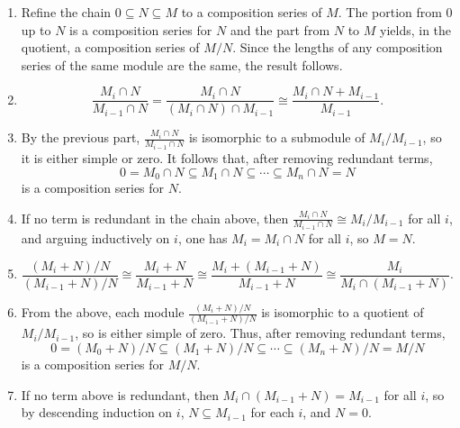 \documentclass[12pt]{amsart}
\renewcommand{\1}{\mathbbm{1}}
\begin{document}
\begin{enumerate}
{\begin{enumerate}
	Now suppose that  $N_{m-1}\neq M_{n-1}$, and set $K\colonequals N_{m-1}\cap M_{n-1}$. By the second isomorphism theorem, we then have
	\[\frac{M}{M_{n-1}} = \frac{M_{n-1}+N_{m-1}}{M_{n-1}} \cong \frac{N_{m-1}}{K}\]
	and similarly $M/N_{m-1} \cong M_{n-1} / K$, and both of these modules are simple. Given a composition series for $K$ of length $t$, one obtains a composition series for $M_{n-1}$ of length $t+1$ and a composition series for $N_{m-1}$ of length $t+1$. Since $\ell(M_{n-1}), \ell(N_{m-1})<\ell(M)$, by induction on length we can assume that $n-1=t+1=m-1$ and we conclude that $m=n$.
	\item Refine the chain $0 \subseteq N \subseteq M$ to a composition series of $M$. The portion from $0$ up to $N$ is a composition series for $N$ and the part from $N$ to $M$ yields, in the quotient, a composition series of $M/N$. Since the lengths of any composition series  of the same module are the same, the result follows.
	\item $$\frac{M_{i} \cap N}{M_{i-1} \cap N} = \frac{M_{i} \cap N}{(M_{i} \cap N) \cap M_{i-1}} \cong \frac{M_{i} \cap N + M_{i-1}} {M_{i-1}}.$$
	\item By the previous part, $\frac{M_{i} \cap N}{M_{i-1} \cap N}$ is isomorphic to a submodule of $M_i / M_{i-1}$, so it is either simple or zero. It follows that, after removing redundant terms,
	\[ 0 = M_0 \cap N \subseteq M_1 \cap N \subseteq \cdots \subseteq M_n \cap N = N\]
	is a composition series for $N$.
	\item If no term is redundant in the chain above, then $\frac{M_{i} \cap N}{M_{i-1} \cap N}\cong M_i/M_{i-1}$ for all $i$, and arguing inductively on $i$, one has $M_i = M_i \cap N$ for all $i$, so $M=N$.
	\item \[ \frac{(M_{i} + N )/ N }{(M_{i-1} + N) / N} \cong \frac{M_{i} + N}{M_{i-1} + N} \cong \frac{M_{i} + (M_{i-1}+N)}{M_{i-1}+N}\cong \frac{M_{i} }{M_{i} \cap( M_{i-1} + N)}.\]
	\item From the above, each module  $\frac{(M_{i} + N )/ N }{(M_{i-1} + N) / N}$ is isomorphic to a quotient of $M_i/M_{i-1}$, so is either simple of zero. Thus, after removing redundant terms, 
	\[ 0 = (M_{0} + N )/ N \subseteq (M_{1} + N )/ N \subseteq \cdots \subseteq (M_{n} + N )/ N = M/N\]
	is a composition series for $M/N$.
	\item If no term above is redundant, then $M_{i} \cap( M_{i-1} + N)=M_{i-1}$ for all $i$, so by descending induction on $i$,   $N\subseteq M_{i-1}$ for each $i$, and $N=0$.
	\end{enumerate}
}


\end{enumerate}
\end{document}
